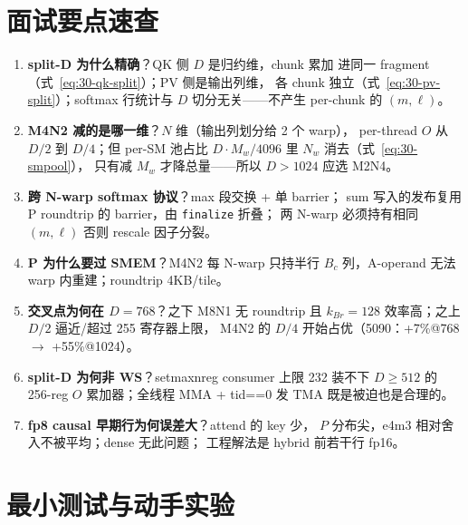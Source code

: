 \section{面试要点速查}

\begin{enumerate}[itemsep=2pt,topsep=2pt]
  \item \textbf{split-D 为什么精确}？QK 侧 $D$ 是归约维，chunk 累加
        进同一 fragment（式~\ref{eq:30-qk-split}）；PV 侧是输出列维，
        各 chunk 独立（式~\ref{eq:30-pv-split}）；softmax 行统计与
        $D$ 切分无关——不产生 per-chunk 的 $(m,\ell)$。
  \item \textbf{M4N2 减的是哪一维}？$N$ 维（输出列划分给 2 个 warp），
        per-thread $O$ 从 $D/2$ 到 $D/4$；但 per-SM 池占比
        $D\cdot M_w/4096$ 里 $N_w$ 消去（式~\ref{eq:30-smpool}），
        只有减 $M_w$ 才降总量——所以 $D>1024$ 应选 M2N4。
  \item \textbf{跨 N-warp softmax 协议}？max 段交换 + 单 barrier；
        sum 写入的发布复用 P roundtrip 的 barrier，由 \texttt{finalize} 折叠；
        两 N-warp 必须持有相同 $(m,\ell)$ 否则 rescale 因子分裂。
  \item \textbf{P 为什么要过 SMEM}？M4N2 每 N-warp 只持半行
        $B_c$ 列，A-operand 无法 warp 内重建；roundtrip 4KB/tile。
  \item \textbf{交叉点为何在 $D=768$}？之下 M8N1 无 roundtrip 且
        $k_{Br}=128$ 效率高；之上 $D/2$ 逼近/超过 255 寄存器上限，
        M4N2 的 $D/4$ 开始占优（5090：+7\%@768 $\to$ +55\%@1024）。
  \item \textbf{split-D 为何非 WS}？setmaxnreg consumer 上限 232
        装不下 $D\ge512$ 的 256-reg $O$ 累加器；全线程 MMA +
        tid==0 发 TMA 既是被迫也是合理的。
  \item \textbf{fp8 causal 早期行为何误差大}？attend 的 key 少，
        $P$ 分布尖，e4m3 相对舍入不被平均；dense 无此问题；
        工程解法是 hybrid 前若干行 fp16。
\end{enumerate}

\section{最小测试与动手实验}

